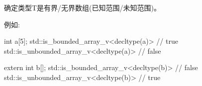 




确定类型T是有界/无界数组(已知范围/未知范围)。

例如:

\begin{cpp}
int a[5];
std::is_bounded_array_v<decltype(a)> // true
std::is_unbounded_array_v<decltype(a)> // false

extern int b[];
std::is_bounded_array_v<decltype(b)> // false
std::is_unbounded_array_v<decltype(b)> // true
\end{cpp}



























